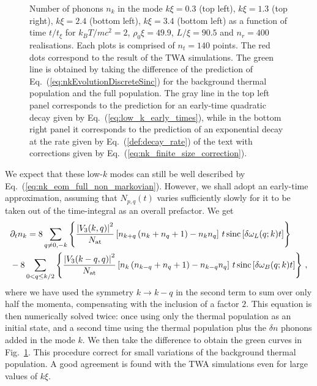 \documentclass[aps,prd,notitlepage,amsfonts,amssymb,amsmath,nofootinbib,superscriptaddress,longbibliography]{revtex4-2}
\begin{document}
\begin{appendices}
\begin{figure}
    \caption{Number of phonons $n_k$ in the mode $k \xi = 0.3$ (top left), $k \xi = 1.3$ (top right), $k \xi = 2.4$ (bottom left), $k \xi = 3.4$ (bottom left) as a function of time $t /t_{\xi}$ for $k_{B} T/ m c^2=2$, $\rho_0 \xi = 49.9$, $L/\xi = 90.5$ and $n_r = 400$ realisations. Each plots is comprised of $n_{t}=140$ points. The red dots correspond to the result of the TWA simulations. The green line is obtained by taking the difference of the prediction of Eq.~(\ref{eq:nkEvolutionDiscreteSinc}) for the background thermal population and the full population. The gray line in the top left panel corresponds to the prediction for an early-time quadratic decay given by Eq.~(\ref{eq:low_k_early_times}), while in the bottom right panel it corresponds to the prediction of an exponential decay at the rate given by Eq.~(\ref{def:decay_rate}) of the text with corrections given by Eq.~(\ref{eq:nk_finite_size_correction}).}
    \label{fig:different_n_k} 
\end{figure}

We expect that these low-$k$ modes can still be well described by Eq.~(\ref{eq:nk_eom_full_non_markovian}).  However, we shall adopt an early-time approximation, assuming that $N_{p,q}(t)$ varies sufficiently slowly for it to be taken out of the time-integral as an overall prefactor. We get
\begin{align}
\begin{split}
\label{eq:nkEvolutionDiscreteSinc}
& \partial_{t}n_{k} = 8  \sum_{q \neq 0, -k} \left\{ \frac{\left| V_{3}(k,q) \right|^{2}}{N_{\rm at}}  \left[ n_{k+q}\left(n_{k}+n_{q}+1\right) - n_{k} n_{q} \right] \, t \, {\rm sinc} \left[ \delta\omega_{L}(q;k) t\right] \right\} \\
    &  -  8  \sum_{ 0 < q \leq k/2 } \left\{ \frac{\left| V_{3}(k-q,q) \right|^{2}}{N_{\rm at}}  \left[ n_{k} \left(n_{k-q} + n_{q} + 1\right) - n_{k-q} n_{q} \right] \, t \, {\rm sinc}\left[ \delta\omega_{B}(q;k) t\right] \right\} \, ,
\end{split}
\end{align}
where we have used the symmetry $k \to k-q$ in the second term to sum over only half the momenta, compensating with the inclusion of a factor $2$. This equation is then numerically solved twice: once using only the thermal population as an initial state, and a second time using the thermal population plus the $\delta n$ phonons added in the mode $k$. We then take the difference to obtain the green curves in Fig.~\ref{fig:different_n_k}. This procedure correct for small variations of the background thermal population. A good agreement is found with the TWA simulations even for large values of $k \xi$. 


\end{appendices}
\end{document}
